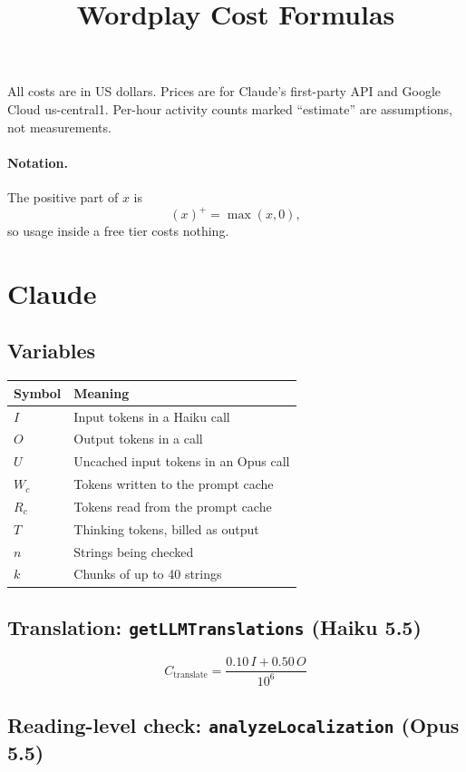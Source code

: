 \documentclass[11pt]{article}
\title{Wordplay Cost Formulas}
\author{}
\date{}
\newcommand{\pos}[1]{\left(#1\right)^{+}}
\begin{document}
\maketitle

All costs are in US dollars. Prices are for Claude's first-party API and
Google Cloud us-central1. Per-hour activity counts marked ``estimate'' are
assumptions, not measurements.

\paragraph{Notation.} The positive part of $x$ is
\[
\pos{x} = \max(x, 0),
\]
so usage inside a free tier costs nothing.

\section{Claude}

\subsection{Variables}

\begin{center}
\begin{tabular}{ll}
\toprule
Symbol & Meaning \\
\midrule
$I$ & Input tokens in a Haiku call \\
$O$ & Output tokens in a call \\
$U$ & Uncached input tokens in an Opus call \\
$W_c$ & Tokens written to the prompt cache \\
$R_c$ & Tokens read from the prompt cache \\
$T$ & Thinking tokens, billed as output \\
$n$ & Strings being checked \\
$k$ & Chunks of up to 40 strings \\
\bottomrule
\end{tabular}
\end{center}

\subsection{Translation: \texttt{getLLMTranslations} (Haiku 5.5)}

\[
C_{\text{translate}} = \frac{0.10\,I + 0.50\,O}{10^{6}}
\]

\subsection{Reading-level check: \texttt{analyzeLocalization} (Opus 5.5)}
\end{document}
